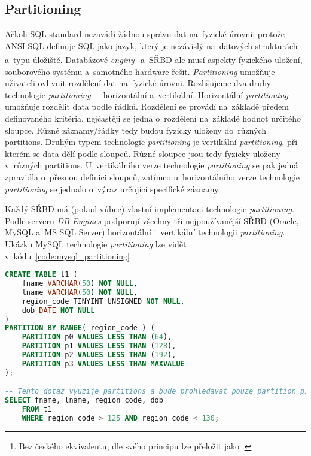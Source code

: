 \subsection{Partitioning}
\label{subsection:partitioning}
Ačkoli SQL standard nezavádí žádnou správu dat na~fyzické úrovni, protože ANSI SQL definuje SQL jako jazyk, který je
nezávislý na~datových strukturách a~typu úložiště. Databázové \textit{enginy}\footnote{Bez českého ekvivalentu, dle svého principu lze přeložit jako .} a~SŘBD ale musí aspekty fyzického uložení,
souborového systému a~samotného hardware řešit. \textit{Partitioning} umožňuje uživateli ovlivnit rozdělení dat na~fyzické
úrovni.
Rozlišujeme dva druhy technologie \textit{partitioning}~--~horizontální a~vertikální. Horizontální \textit{partitioning} umožňuje rozdělit data
podle řádků. Rozdělení se provádí na~základě předem definovaného kritéria, nejčastěji se jedná o~rozdělení
na~základě hodnot určitého sloupce. Různé záznamy/řádky tedy budou fyzicky uloženy do~různých partitions. Druhým
typem technologie \textit{partitioning} je vertikální \textit{partitioning}, při kterém se data dělí podle sloupců. Různé sloupce jsou tedy
fyzicky uloženy v~různých partitions. U~vertikálního verze technologie \textit{partitioning} se pak jedná zpravidla o~přesnou definici
sloupců, zatímco u~horizontálního verze technologie \textit{partitioning} se jednalo o~výraz určující specifické záznamy.

Každý SŘBD má (pokud vůbec) vlastní implementaci technologie \textit{partitioning}. Podle serveru \textit{DB Engines} podporují všechny tři nejpoužívanější SŘBD (Oracle, MySQL a~MS SQL Server) horizontální i~vertikální technologii \textit{partitioning}. Ukázku MySQL technologie \textit{partitioning} lze vidět v~kódu~\ref{code:mysql_partitioning}
\lstset{frame=single}
\begin{lstlisting}[language=SQL, basicstyle=\footnotesize\ttfamily, label={code:mysql_partitioning}, caption=Vytvoření tabulky \texttt{t1} rozdělené do~4 partitions podle hodnoty v~sloupci \texttt{region\_code}. Následuje dotaz nad~tabulkou \texttt{t1}{,} kdy databázový systém může efektivně využít partition p1{,} protože dle~klauzule \texttt{WHERE} se hledají záznamy{,} kde atribut \texttt{region\_code} leží mezi~125 a~130{,} čemuž odpovídá jen a~pouze partition p1.]
CREATE TABLE t1 (
    fname VARCHAR(50) NOT NULL,
    lname VARCHAR(50) NOT NULL,
    region_code TINYINT UNSIGNED NOT NULL,
    dob DATE NOT NULL
)
PARTITION BY RANGE( region_code ) (
    PARTITION p0 VALUES LESS THAN (64),
    PARTITION p1 VALUES LESS THAN (128),
    PARTITION p2 VALUES LESS THAN (192),
    PARTITION p3 VALUES LESS THAN MAXVALUE
);

-- Tento dotaz vyuzije partitions a bude prohledavat pouze partition p1.
SELECT fname, lname, region_code, dob
    FROM t1
    WHERE region_code > 125 AND region_code < 130;
\end{lstlisting}

